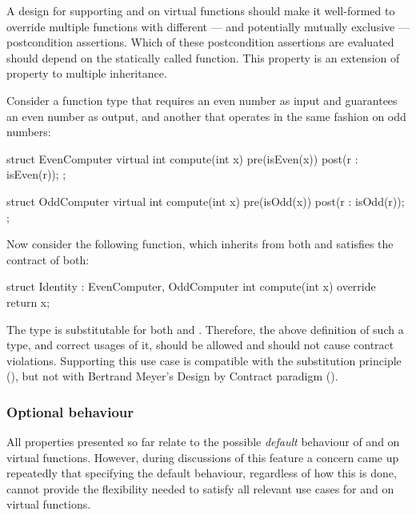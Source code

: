 
A design for supporting  and  on virtual functions should make it well-formed to override multiple functions with different --- and potentially mutually exclusive --- postcondition assertions. Which of these postcondition assertions are evaluated should depend on the statically called function. This property is an extension of property  to multiple inheritance.

Consider a function type that requires
an even number as input and guarantees an even number as output, and another that operates in
the same fashion on odd numbers:

\begin{codeblock}
struct EvenComputer {
  virtual int compute(int x)
    pre(isEven(x))
    post(r : isEven(r));
};

struct OddComputer {
  virtual int compute(int x)
    pre(isOdd(x))
    post(r : isOdd(r));
};
\end{codeblock}

Now consider the following function, which inherits from both and satisfies the contract of both:

\begin{codeblock}
struct Identity : EvenComputer, OddComputer {
  int compute(int x) override { 
    return x; 
  }
}
\end{codeblock}

The type  is substitutable for both  and . Therefore, the above definition of such a type, and correct usages of it, should be allowed and should not cause contract violations. Supporting this use case is compatible with the substitution principle (), but not with Bertrand Meyer's Design by Contract paradigm ().


\subsubsection{Optional behaviour}

All properties presented so far relate to the possible \emph{default} behaviour of  and  on virtual functions. However, during discussions of this feature a concern came up repeatedly that specifying the default behaviour, regardless of how this is done, cannot provide the flexibility needed to  satisfy all relevant use cases for  and  on virtual functions.

